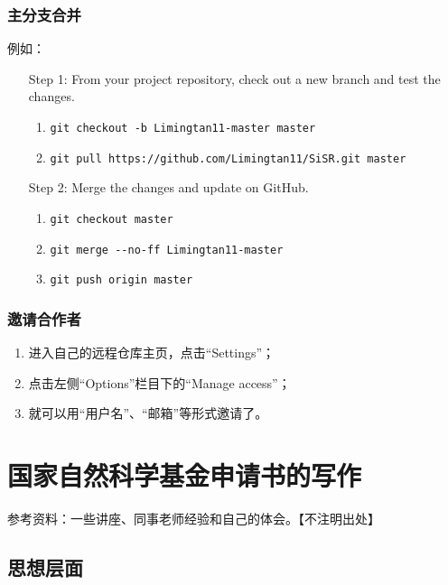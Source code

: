 \subsection{主分支合并}
例如：
\begin{itemize}
\item[Step 1:] From your project repository, check out a new branch and test the changes.
\begin{enumerate}
\item \verb|git checkout -b Limingtan11-master master|

\item \verb|git pull https://github.com/Limingtan11/SiSR.git master|
\end{enumerate}

\item [Step 2:] Merge the changes and update on GitHub.
\begin{enumerate}
\item  \verb|git checkout master|

\item \verb|git merge --no-ff Limingtan11-master|

\item \verb|git push origin master|
\end{enumerate}
\end{itemize}



\subsection{邀请合作者}
\begin{enumerate}
\item 进入自己的远程仓库主页，点击“Settings”；
\item 点击左侧“Options”栏目下的“Manage access”；
\item 就可以用“用户名”、“邮箱”等形式邀请了。
\end{enumerate}












\chapter{国家自然科学基金申请书的写作}
参考资料：一些讲座、同事老师经验和自己的体会。【不注明出处】
\section{思想层面}
